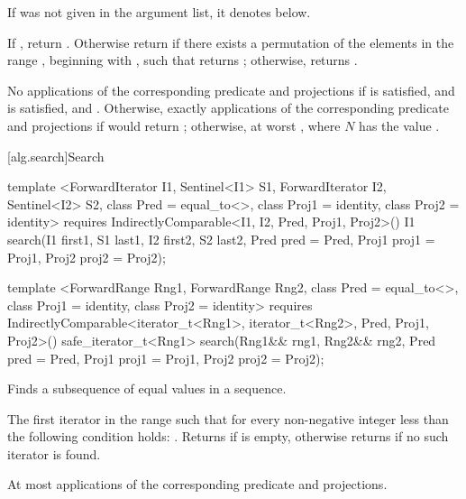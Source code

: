 \begin{itemdescr}
\pnum
\remarks If  was not given in the argument list, it denotes
 below.

\pnum
\returns If , return .
Otherwise return  if there exists a permutation of the elements in the
range , beginning with
, such that
 returns 
; otherwise, returns .

\pnum
\complexity
No applications of the corresponding predicate and projections if
 is satisfied, and
 is satisfied,
and .
Otherwise, exactly  applications of the
corresponding predicate and projections if
would return ; otherwise, at
worst , where $N$ has the value .
\end{itemdescr}

[alg.search]{Search}

%
\begin{itemdecl}
template <ForwardIterator I1, Sentinel<I1> S1, ForwardIterator I2,
    Sentinel<I2> S2, class Pred = equal_to<>,
    class Proj1 = identity, class Proj2 = identity>
  requires IndirectlyComparable<I1, I2, Pred, Proj1, Proj2>()
  I1
    search(I1 first1, S1 last1, I2 first2, S2 last2,
           Pred pred = Pred{},
           Proj1 proj1 = Proj1{}, Proj2 proj2 = Proj2{});

template <ForwardRange Rng1, ForwardRange Rng2, class Pred = equal_to<>,
    class Proj1 = identity, class Proj2 = identity>
  requires IndirectlyComparable<iterator_t<Rng1>, iterator_t<Rng2>, Pred, Proj1, Proj2>()
  safe_iterator_t<Rng1>
    search(Rng1&& rng1, Rng2&& rng2, Pred pred = Pred{},
           Proj1 proj1 = Proj1{}, Proj2 proj2 = Proj2{});
\end{itemdecl}

\begin{itemdescr}
\pnum
\effects
Finds a subsequence of equal values in a sequence.

\pnum
\returns
The first iterator
in the range 
such that for every non-negative integer
less than
the following condition holds:
.
Returns 
if  is empty,
otherwise returns 
if no such iterator is found.

\pnum
\complexity
At most
applications of the corresponding predicate and projections.
\end{itemdescr}

